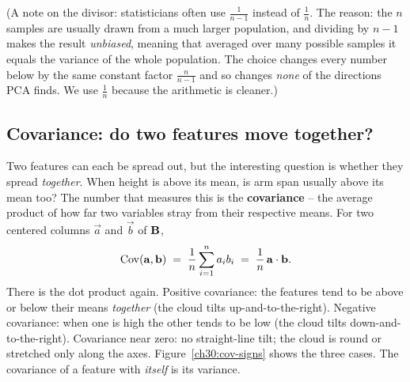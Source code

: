 (A note on the divisor: statisticians often use $\tfrac{1}{n-1}$ instead of
$\tfrac1n$. The reason: the $n$ samples are usually drawn from a much larger
population, and dividing by $n-1$ makes the result \emph{unbiased}, meaning that
averaged over many possible samples it equals the variance of the whole population.
The choice changes every number below by the same constant factor $\tfrac{n}{n-1}$
and so changes \emph{none} of the directions PCA finds. We use $\tfrac1n$ because the
arithmetic is cleaner.)

\subsection{Covariance: do two features move together?}

Two features can each be spread out, but the interesting question is whether they
spread \emph{together}. When height is above its mean, is arm span usually above
its mean too? The number that measures this is the \textbf{covariance} -- the
average product of how far two variables stray from their respective means. For two
centered columns $\vec a$ and $\vec b$ of $\mathbf{B}$,
\[
  \operatorname{Cov}(\mathbf{a},\mathbf{b}) \;=\; \frac{1}{n}\sum_{i=1}^n a_i b_i
  \;=\; \frac{1}{n}\,\mathbf{a}\cdot\mathbf{b}.
\]
There is the dot product again. Positive covariance: the features tend to be above
or below their means \emph{together} (the cloud tilts up-and-to-the-right).
Negative covariance: when one is high the other tends to be low (the cloud tilts
down-and-to-the-right). Covariance near zero: no straight-line tilt; the cloud is round or
stretched only along the axes. Figure~\ref{ch30:cov-signs} shows the three cases.
The covariance of a feature with \emph{itself} is its variance.

